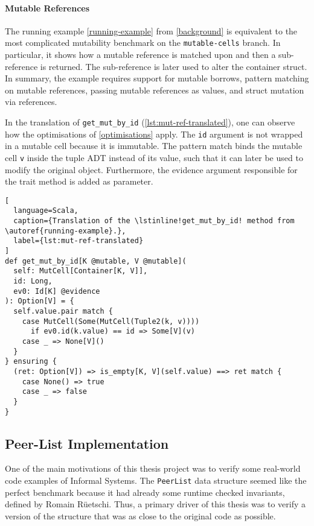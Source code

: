 \paragraph{Mutable References}

The running example \autoref{running-example} from \autoref{background} is
equivalent to the most complicated mutability benchmark on the
\texttt{mutable-cells} branch. In particular, it shows how a mutable reference
is matched upon and then a sub-reference is returned. The sub-reference is later
used to alter the container struct. In summary, the example requires support for
mutable borrows, pattern matching on mutable references, passing mutable
references as values, and struct mutation via references.

In the translation of \lstinline!get_mut_by_id!
(\autoref{lst:mut-ref-translated}), one can observe how the optimisations of
\autoref{optimisations} apply. The \lstinline!id! argument is not wrapped in a
mutable cell because it is immutable. The pattern match binds the mutable cell
\lstinline!v! inside the tuple ADT instead of its value, such that it can later
be used to modify the original object. Furthermore, the evidence argument
responsible for the trait method is added as parameter.

\begin{lstlisting}[
  language=Scala,
  caption={Translation of the \lstinline!get_mut_by_id! method from \autoref{running-example}.},
  label={lst:mut-ref-translated}
]
def get_mut_by_id[K @mutable, V @mutable](
  self: MutCell[Container[K, V]],
  id: Long,
  ev0: Id[K] @evidence
): Option[V] = {
  self.value.pair match {
    case MutCell(Some(MutCell(Tuple2(k, v))))
      if ev0.id(k.value) == id => Some[V](v)
    case _ => None[V]()
  }
} ensuring {
  (ret: Option[V]) => is_empty[K, V](self.value) ==> ret match {
    case None() => true
    case _ => false
  }
}
\end{lstlisting}

\subsection{Peer-List Implementation}
\label{peerlist}

One of the main motivations of this thesis project was to verify some real-world
code examples of Informal Systems. The \lstinline!PeerList! data structure
seemed like the perfect benchmark because it had already some runtime checked
invariants, defined by Romain Rüetschi. Thus, a primary driver of this thesis
was  to verify a version of the structure that was as close to the original code
as possible.

